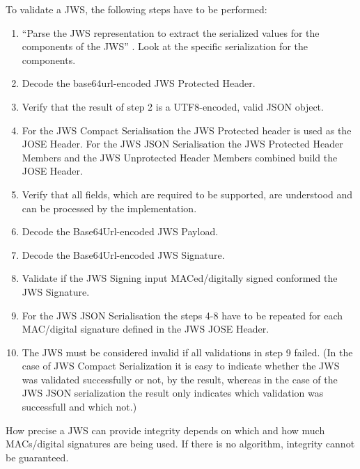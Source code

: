 To validate a JWS, the following steps have to be performed:\newline  
\begin{enumerate} [leftmargin=1cm, rightmargin=1cm] \itemsep0.3em
\item ``Parse the JWS representation to extract the serialized values for the components of the JWS'' \cite{rfc7515}. Look at the specific serialization for the components.
\item Decode the base64url-encoded JWS Protected Header.
\item Verify that the result of step 2 is a UTF8-encoded, valid JSON object.
\item For the JWS Compact Serialisation the JWS Protected header is used as the JOSE Header. For the JWS JSON Serialisation the JWS Protected Header Members and the JWS Unprotected Header Members combined build the JOSE Header.
\item Verify that all fields, which are required to be supported, are understood and can be processed by the implementation.
\item Decode the Base64Url-encoded JWS Payload.
\item Decode the Base64Url-encoded JWS Signature.
\item Validate if the JWS Signing input MACed/digitally signed conformed the JWS Signature.
\item For the JWS JSON Serialisation the steps 4-8 have to be repeated for each MAC/digital signature defined in the JWS JOSE Header.
\item The JWS must be considered invalid if all validations in step 9 failed. (In the case of JWS Compact Serialization it is easy to indicate whether the JWS was validated successfully or not, by the result, whereas in the case of the JWS JSON serialization the result only indicates which validation was successfull and which not.)
\end{enumerate}
How precise a JWS can provide integrity depends on which and how much MACs/digital signatures are being used. If there is no algorithm, integrity cannot be guaranteed. 
